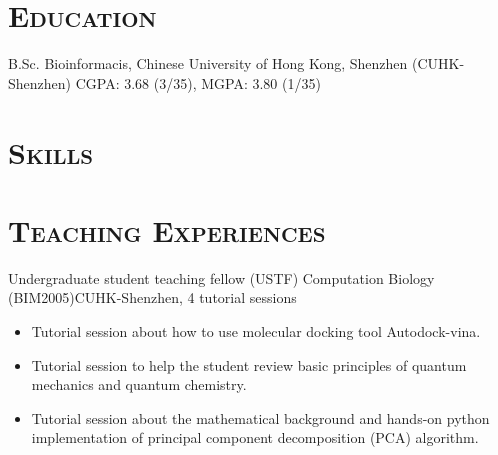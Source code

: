 \documentclass[11pt,a4paper]{moderncv}
\newcommand{\cvsection}[1]{\section{\textsc{#1}}}
\begin{document}
\maketitle

\cvsection{Education}
        {B.Sc.}
        {}
        {Bioinformacis, Chinese University of Hong Kong, Shenzhen (CUHK-Shenzhen)}
        {}
        {CGPA: 3.68 (3/35), MGPA: 3.80 (1/35)}

\cvsection{Skills}

\cvsection{Teaching Experiences}
        {Undergraduate student teaching fellow (USTF)}{}
        {Computation Biology (BIM2005)}{CUHK-Shenzhen, 4 tutorial sessions}
        {
            \begin{itemize}
                \item Tutorial session about how to use molecular docking tool Autodock-vina.
                \item Tutorial session to help the student review basic principles of quantum mechanics and quantum chemistry.
                \item Tutorial session about the mathematical background and hands-on python implementation of principal component decomposition (PCA) algorithm.
            \end{itemize}
        }
\end{document}
